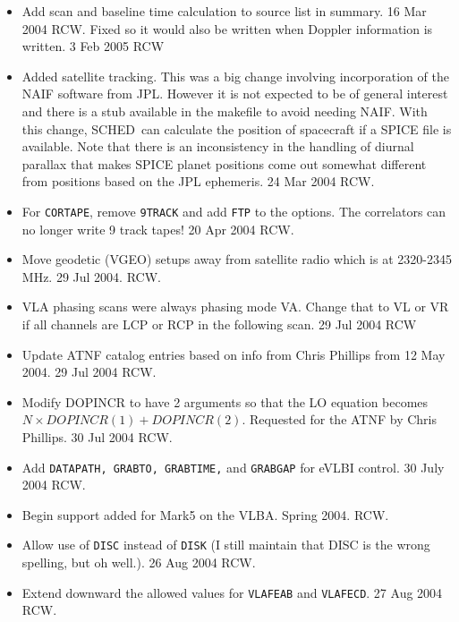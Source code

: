 \documentclass{report}
\newcommand{\schedb}{{\sc SCHED~}}
\begin{document}
\begin{itemize}
\item  Add scan and baseline time calculation to source list in
summary.  16 Mar 2004  RCW.  Fixed so it would also be written when
Doppler information is written.  3 Feb 2005  RCW

\item  Added satellite tracking.  This was a big change involving
incorporation of the NAIF software from JPL.  However it is not expected
to be of general interest and there is a stub available in the makefile
to avoid needing NAIF.  With this change, \schedb can calculate the
position of spacecraft if a SPICE file is available.  Note that there
is an inconsistency in the handling of diurnal parallax that makes SPICE
planet positions come out somewhat different from positions based on
the JPL ephemeris. 24 Mar 2004 RCW.

\item For {\tt CORTAPE}, remove {\tt 9TRACK} and add {\tt FTP} to the
options.  The correlators can no longer write 9 track tapes! 20 Apr
2004 RCW.

\item Move geodetic (VGEO) setups away from satellite radio which is
at 2320-2345 MHz.  29 Jul 2004. RCW.

\item VLA phasing scans were always phasing mode VA.  Change that to
VL or VR if all channels are LCP or RCP in the following scan. 29 Jul
2004 RCW

\item Update ATNF catalog entries based on info from Chris
Phillips from 12 May 2004. 29 Jul 2004  RCW.

\item Modify DOPINCR to have 2 arguments so that the LO equation becomes
$N \times DOPINCR(1) + DOPINCR(2)$.  Requested for the ATNF by Chris
Phillips.  30 Jul 2004  RCW.

\item Add {\tt DATAPATH, GRABTO, GRABTIME,} and {\tt GRABGAP} for eVLBI
control. 30 July 2004 RCW.

\item Begin support added for Mark5 on the VLBA.  Spring 2004.  RCW.

\item Allow use of {\tt DISC} instead of {\tt DISK} (I still maintain
that DISC is the wrong spelling, but oh well.). 26 Aug 2004 RCW.

\item Extend downward the allowed values for {\tt VLAFEAB} and
{\tt VLAFECD}.  27 Aug 2004 RCW.


\end{itemize}
\end{document}
